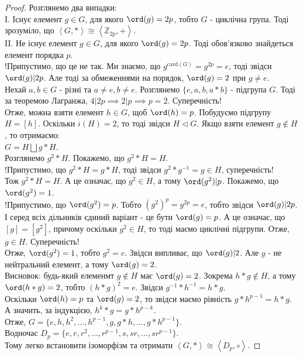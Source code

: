 \documentclass{math_library}
\begin{document}
\begin{proof}
Розглянемо два випадки:\\
I. Існує елемент $g \in G$, для якого $\ord (g) = 2p$, тобто $G$ - циклічна група. Тоді зрозуміло, що $\left< G, * \right> \cong \left< \mathbb{Z}_{2p},+ \right>$.
\bigskip \\
II. Не існує елемент $g \in G$, для якого $\ord(g) = 2p$. Тоді обов'язково знайдеться елемент порядка $p$.\\
!Припустимо, що це не так. Ми знаємо, що $g^{\text{card}(G)} = g^{2p} = e$, тоді звідси $\ord(g) | 2p$. Але тоді за обмеженнями на порядок, $\ord(g) = 2$ при $g \neq e$.\\
Нехай $a,b \in G$ - різні та $a \neq e, b \neq e$. Розглянемо $\{e,a,b,a*b\}$ - підгрупа $G$. Тоді за теоремою Лагранжа, $4 | 2p \implies 2 | p \implies p = 2$. Суперечність!\\
Отже, можна взяти елемент $h \in G$, щоб $\ord(h) = p$. Побудуємо підгрупу $H = [h]$. Оскільки $i(H) = 2$, то тоді звідси $H \triangleleft G$. Якщо взяти елемент $g \not\in H$, то отримаємо:\\
$G = H \bigsqcup g*H$.\\
Розглянемо $g^2 * H$. Покажемо, що $g^2 * H = H$.\\
!Припустимо, що $g^2 * H = g * H$, тоді звідси $g^2 * g^{-1} = g \in H$, суперечність!\\
Тож $g^2 * H = H$. А це означає, що $g^2 \in H$, а тому $\ord(g^2) | p$. Покажемо, що $\ord(g^2) = 1$.\\
!Припустимо, що $\ord(g^2) = p$. Тобто $(g^{2})^p = g^{2p} = e$, тобто звідси $\ord(g) | 2p$. І серед всіх дільників єдиний варіант - це бути $\ord(g) = p$. А це означає, що $[g] = [g^2]$, причому оскільки $g^2 \in H$, то тоді маємо циклічні підгрупи. Отже, $g \in H$. Суперечність!\\
Отже, $\ord(g^2) = 1$, тобто $g^2 = e$. Звідси випливає, що $\ord(g) | 2$. Але $g$ - не нейтральний елемент, а тому $\ord(g) = 2$.\\
Висновок: будь-який елеменмт $g \not \in H$ має $\ord(g) = 2$. Зокрема $h*g \not\in H$, а тому $\ord(h*g) = 2$, тобто $(h*g)^2 = e$. Звідси $g^{-1}*h^{-1} = h*g$.\\
Оскільки $\ord(h) = p$ та $\ord(g) = 2$, то звідси маємо рівність $g*h^{p-1} = h*g$. А значить, за індукцією, $h^k*g = g *h^{p-k}$.\\
Отже, $G = \{e,h,h^2,\dots,h^{p-1}, g, g*h, \dots, g*h^{p-1}\}$.\\
Водночас $D_p = \{e,r,r^2,\dots,r^{p-1},s, sr, \dots, sr^{p-1}\}$.\\
Тому легко встановити ізоморфізм та отримати $\left<G,* \right> \cong \left< D_p, \circ \right>$.
\end{proof}
\end{document}
